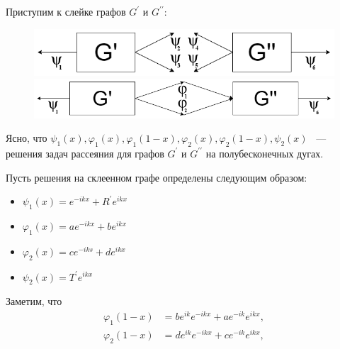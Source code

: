 \documentclass[a4 paper, 12 pt]{extarticle}
\begin{document}
   Приступим к слейке графов $G^\prime$ и $G^{\prime \prime}$:
   \begin{figure}[!htb]
   	\centering
   	\includegraphics[scale=0.54]{skleika2.png} \\
   	\includegraphics[scale=0.45]{skleika3.png}
   \end{figure}

   Ясно, что $\psi_1\left(x\right), \varphi_1\left(x\right), \varphi_1\left(1-x\right), \varphi_2\left(x\right), \varphi_2\left(1-x\right), \psi_2\left(x\right)$ ~--- решения задач рассеяния для графов  $G^\prime$ и $G^{\prime \prime}$ на полубесконечных дугах.
   
   Пусть решения на склеенном графе определены следующим образом:
   \begin{itemize}
   	\item $ \psi_1\left(x\right) = e^{-ikx} + R^\prime e^{ikx} $
   	\item $ \varphi_1\left(x\right)  = a e^{-ikx} + b e^{ikx} $
   	\item $ \varphi_2\left(x\right) = c e^{-iks} + d e^{ikx} $
   	\item $ \psi_2\left(x\right) = T^\prime e^{ikx}$
   \end{itemize}
   Заметим, что
   \[
   \begin{aligned}
   \varphi_1\left(1-x\right) &= b e^{ik} e^{-ikx} + a e^{-ik} e^{ikx}, \\
   \varphi_2\left(1-x\right) &= d e^{ik} e^{-ikx} + c e^{-ik} e^{ikx},
   \end{aligned}\]
   
\end{document}
